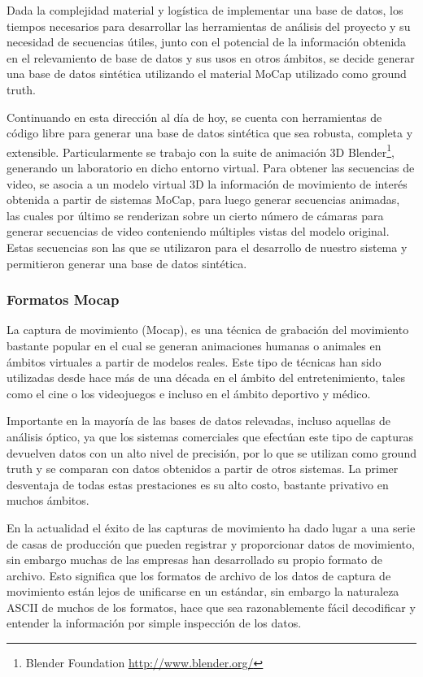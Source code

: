 Dada la complejidad material y logística de implementar una base de datos, los tiempos necesarios para desarrollar las herramientas de análisis del proyecto y su necesidad de secuencias útiles, junto con el potencial de la información obtenida en el relevamiento de base de datos y sus usos en otros ámbitos, se decide generar una base de datos sintética utilizando el material MoCap utilizado como ground truth.


Continuando en esta dirección al día de hoy, se cuenta con herramientas de código libre para generar una base de datos sintética que sea robusta, completa y extensible. Particularmente se trabajo con la suite de animación 3D Blender\footnote{ Blender Foundation \textcolor{blue}{\underline{\url{http://www.blender.org/}}}}, generando un laboratorio en dicho entorno virtual. Para obtener las secuencias de video, se asocia a un modelo  virtual 3D la información de movimiento de interés obtenida a partir de sistemas MoCap, para luego generar secuencias animadas, las cuales por último se renderizan sobre un cierto número de cámaras para generar secuencias de video conteniendo múltiples vistas del modelo original. Estas secuencias son las que se utilizaron para el desarrollo de nuestro sistema y permitieron generar una base de datos sintética. 


\subsubsection{Formatos Mocap}
La captura de movimiento (Mocap), es una técnica de grabación del movimiento bastante popular en el cual se generan animaciones humanas o animales en ámbitos virtuales a partir de modelos reales. Este tipo de técnicas han sido utilizadas desde hace más de una década en el ámbito del entretenimiento, tales como el cine o los videojuegos e incluso en el ámbito deportivo y médico. 


Importante en la mayoría de las bases de datos relevadas, incluso aquellas de análisis óptico, ya que los sistemas comerciales que efectúan este tipo de capturas devuelven datos con un alto nivel de precisión, por lo que se utilizan como ground truth y se comparan con datos obtenidos a partir de otros sistemas. La primer desventaja de todas estas prestaciones es su alto costo, bastante privativo en muchos ámbitos.

En la actualidad el éxito de las capturas de movimiento ha dado lugar a una serie de casas de producción que pueden registrar y proporcionar datos de movimiento, sin embargo muchas de las empresas han desarrollado su propio formato de archivo. Esto significa que los formatos de archivo de los datos de captura de movimiento
están lejos de unificarse en un estándar, sin embargo la naturaleza ASCII de muchos de los formatos, hace que sea razonablemente fácil decodificar y entender la información por simple inspección de los datos.

